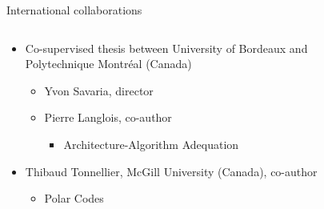 \documentclass[t,compress,mathserif,12pt,xcolor=dvipsnames]{beamer}
\begin{document}
\begin{frame}[t]{International collaborations}
  \begin{minipage}[t][5.0cm][t]{\textwidth}
      \vspace{-0.4cm}
    \begin{columns}[T]
      \begin{column}{0.63\textwidth}
        \small{
          \begin{itemize}
            \item<+-> Co-supervised thesis between University of Bordeaux and Polytechnique Montréal (Canada)
            \begin{itemize}
            \item<1-> Yvon Savaria, director
            \item<1-> Pierre Langlois, co-author
            \begin{itemize}
              \item<+->[$\rightarrow$] Architecture-Algorithm Adequation
            \end{itemize}
            \end{itemize}
            \vspace{0.25cm}
            \item<+-> Thibaud Tonnellier, McGill University (Canada), co-author
            \begin{itemize}
              \item<+->[$\rightarrow$] Polar Codes
            \end{itemize}
          \end{itemize}
        }
      \end{column}
      \begin{column}{0.04\textwidth}
      \end{column}
      \begin{column}{0.33\textwidth}
      \centering

\end{column}
\end{columns}
\end{minipage}
\end{frame}
\end{document}
